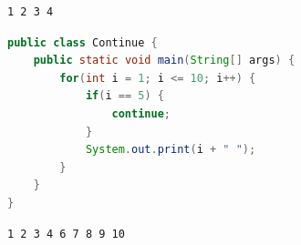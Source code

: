 \begin{tcolorbox}
    \begin{verbatim}
1 2 3 4
\end{verbatim}
\end{tcolorbox}

\vspace{0.5cm}


\begin{lstlisting}[language=Java]
public class Continue {
    public static void main(String[] args) {
        for(int i = 1; i <= 10; i++) {
            if(i == 5) {
                continue;
            }
            System.out.print(i + " ");
        }
    }
}
\end{lstlisting}

\begin{tcolorbox}
    \begin{verbatim}
1 2 3 4 6 7 8 9 10
\end{verbatim}
\end{tcolorbox}

\newpage